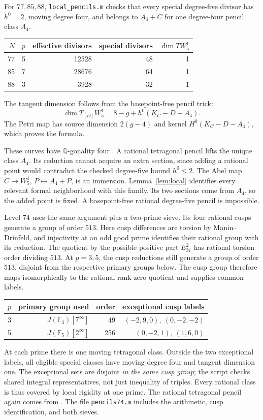 \documentclass[11pt,a4paper]{article}
\newcommand{\Q}{\mathbb Q}
\newcommand{\F}{\mathbb F}
\begin{document}
For $77,85,88$, \texttt{local\_pencils.m} checks that every special
degree-five divisor has $h^0=2$, moving degree four, and belongs to
$A_4+C$ for one degree-four pencil class $A_4$.
\begin{center}
\begin{tabular}{@{}rrrrr@{}}
\toprule $N$&$p$&effective divisors&special divisors&$\dim T W^1_5$\\
\midrule
77&5&12528&48&1\\
85&7&28676&64&1\\
88&3&3928&32&1\\
\bottomrule
\end{tabular}
\end{center}
The tangent dimension follows from the basepoint-free pencil trick:
\[
                 \dim T_{[D]}W^1_5=8-g+h^0(K_C-D-A_4).
\]
The Petri map has source dimension $2(g-4)$ and kernel
$H^0(K_C-D-A_4)$, which proves the formula.

These curves have $\Q$-gonality four \cite[Theorem~1.2]{NO}.
A rational tetragonal pencil lifts the unique class $A_4$. Its reduction
cannot acquire an extra section, since adding a rational point would
contradict the checked degree-five bound $h^0\le2$.
The Abel map $C\to W^1_5$, $P\mapsto A_4+P$, is an immersion.
Lemma~\ref{lem:local} identifies every relevant formal neighborhood
with this family. Its two sections come from $A_4$, so the added point
is fixed. A basepoint-free rational degree-five pencil is impossible.

Level $74$ uses the same argument plus a two-prime sieve.
Its four rational cusps generate a group of order $513$.
Here cusp differences are torsion by Manin--Drinfeld, and injectivity
at an odd good prime identifies their rational group with its reduction.
The quotient by the possible positive part $E_{37}^2$ has rational
torsion order dividing $513$. At $p=3,5$, the cusp reductions still
generate a group of order $513$, disjoint from the respective primary
groups below. The cusp group therefore maps isomorphically to the
rational rank-zero quotient and supplies common labels.
\begin{center}
\begin{tabular}{@{}rrrr@{}}
\toprule $p$&primary group used&order&exceptional cusp labels\\
\midrule
3&$J(\F_3)[7^\infty]$&49&$(-2,9,0),\ (0,-2,-2)$\\
5&$J(\F_5)[2^\infty]$&256&$(0,-2,1),\ (1,6,0)$\\
\bottomrule
\end{tabular}
\end{center}
At each prime there is one moving tetragonal class. Outside the two
exceptional labels, all eligible special classes have moving degree four
and tangent dimension one. The exceptional sets are disjoint
\emph{in the same cusp group}; the script checks shared integral
representatives, not just inequality of triples.
Every rational class is thus covered by local rigidity at one prime.
The rational tetragonal pencil again comes from \cite{NO}.
The file \texttt{pencils74.m} includes the arithmetic, cusp identification,
and both sieves.
\end{document}
